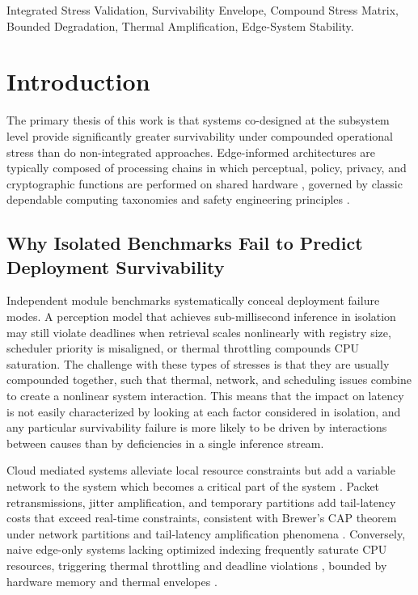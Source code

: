 \documentclass[conference]{IEEEtran}
\begin{document}
\begin{IEEEkeywords}
Integrated Stress Validation, Survivability Envelope, Compound Stress Matrix, Bounded Degradation, Thermal Amplification, Edge-System Stability.
\end{IEEEkeywords}

\section{Introduction}

The primary thesis of this work is that systems co-designed at the subsystem level provide significantly greater survivability under compounded operational stress than do non-integrated approaches. Edge-informed architectures \cite{b5, b23} are typically composed of processing chains in which perceptual, policy, privacy, and cryptographic functions are performed on shared hardware \cite{b12, b22}, governed by classic dependable computing taxonomies \cite{b16, b17} and safety engineering principles \cite{b36}.

\subsection{Why Isolated Benchmarks Fail to Predict Deployment Survivability}
Independent module benchmarks systematically conceal deployment failure modes. A perception model that achieves sub-millisecond inference in isolation may still violate deadlines when retrieval scales nonlinearly with registry size, scheduler priority is misaligned, or thermal throttling compounds CPU saturation. The challenge with these types of stresses is that they are usually compounded together, such that thermal, network, and scheduling issues combine to create a nonlinear system interaction. This means that the impact on latency is not easily characterized by looking at each factor considered in isolation, and any particular survivability failure is more likely to be driven by interactions between causes than by deficiencies in a single inference stream.

Cloud mediated systems \cite{b10, b33, b34} alleviate local resource constraints but add a variable network to the system which becomes a critical part of the system \cite{b4, b20, b21}. Packet retransmissions, jitter amplification, and temporary partitions add tail-latency costs that exceed real-time constraints, consistent with Brewer's CAP theorem under network partitions \cite{b25, b27} and tail-latency amplification phenomena \cite{b35}. Conversely, naive edge-only systems lacking optimized indexing frequently saturate CPU resources, triggering thermal throttling and deadline violations \cite{b18, b19}, bounded by hardware memory and thermal envelopes \cite{b30}.
\end{document}
